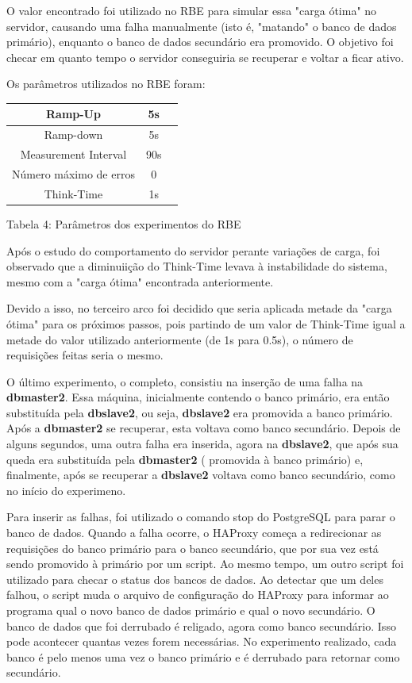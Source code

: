 \documentclass[11pt,twoside]{article}
\begin{document}
O valor encontrado foi utilizado no RBE para simular essa "carga ótima" no servidor, causando uma falha manualmente (isto é, "matando" o banco de dados primário), enquanto o banco de dados secundário era promovido. O objetivo foi checar em quanto tempo o servidor conseguiria se recuperar e voltar a ficar ativo.

Os parâmetros utilizados no RBE foram:

    \begin{center}
        \begin{tabular} { | c | c | c |}
        \hline
        Ramp-Up  & 5s \\ \hline
        Ramp-down & 5s \\ \hline
        Measurement Interval & 90s \\ \hline
        Número máximo de erros & 0 \\ \hline
        Think-Time & 1s \\
        \hline
        \end{tabular}

        Tabela 4: Parâmetros dos experimentos do RBE
    \end{center}
    

Após o estudo do comportamento do servidor perante variações de carga, foi observado que a diminuiição do Think-Time levava à instabilidade do sistema, mesmo com a "carga ótima" encontrada anteriormente.

Devido a isso, no terceiro arco foi decidido que seria aplicada metade da "carga ótima" para os próximos passos, pois partindo de um valor de Think-Time igual a metade do valor utilizado anteriormente (de 1s para 0.5s), o número de requisições feitas seria o mesmo. 

O último experimento, o completo, consistiu na inserção de uma falha na \textbf{dbmaster2}. Essa máquina, inicialmente contendo o banco primário, era então substituída pela \textbf{dbslave2}, ou seja, \textbf{dbslave2} era promovida a banco primário. Após a \textbf{dbmaster2} se recuperar, esta  voltava como banco secundário. Depois de alguns segundos, uma outra falha era inserida, agora na \textbf{dbslave2}, que após sua queda era substituída pela \textbf{dbmaster2} ( promovida à banco primário) e, finalmente, após se recuperar a \textbf{dbslave2} voltava como banco secundário, como no início do experimeno.

Para inserir as falhas, foi utilizado o comando stop do PostgreSQL para parar o banco de dados. Quando a falha ocorre, o HAProxy começa a redirecionar as requisições do banco primário para o banco secundário, que por sua vez está sendo promovido à primário por um script. Ao mesmo tempo, um outro script foi utilizado para checar o status dos bancos de dados. Ao detectar que um deles falhou, o script muda o arquivo de configuração do HAProxy para informar ao programa qual o novo banco de dados primário e qual o novo secundário. O banco de dados que foi derrubado é religado, agora como banco secundário. Isso pode acontecer quantas vezes forem necessárias. No experimento realizado, cada banco é pelo menos uma vez o banco primário e é derrubado para retornar como secundário.
\end{document}
